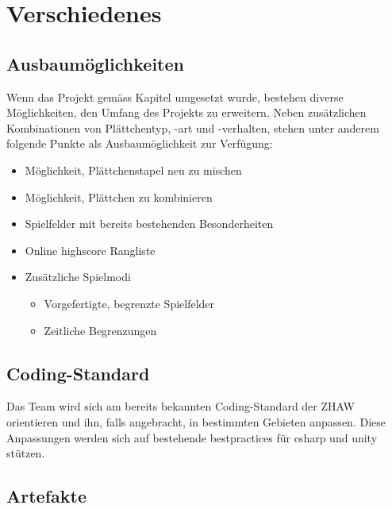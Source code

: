 \documentclass[../main.tex]{subfiles}
\begin{document}
	\section{Verschiedenes}
	
	\subsection{Ausbaumöglichkeiten}
	\par Wenn das Projekt gemäss Kapitel  umgesetzt wurde, bestehen diverse Möglichkeiten, den Umfang des Projekts zu erweitern. Neben zusätzlichen Kombinationen von Plättchentyp, -art und -verhalten, stehen unter anderem folgende Punkte als Ausbaumöglichkeit zur Verfügung:
	\begin{itemize}
		\item Möglichkeit, Plättchenstapel neu zu mischen
		\item Möglichkeit, Plättchen zu kombinieren
		\item Spielfelder mit bereits bestehenden Besonderheiten
		\item Online \gls{highscore} Rangliste
		\item Zusätzliche Spielmodi
		\begin{itemize}
			\item Vorgefertigte, begrenzte Spielfelder
			\item Zeitliche Begrenzungen
		\end{itemize}
	\end{itemize}
	\subsection{Coding-Standard}
	\par Das Team wird sich am bereits bekannten Coding-Standard der ZHAW orientieren und ihn, falls angebracht, in bestimmten Gebieten anpassen. Diese Anpassungen werden sich auf bestehende \glspl{bestpractice} für \gls{csharp} und \gls{unity} stützen.
	\subsection{Artefakte}
\end{document}
